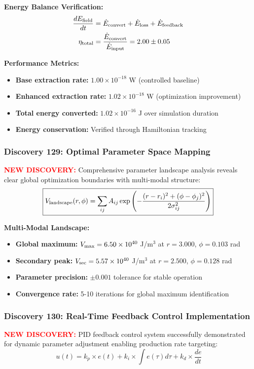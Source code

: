 \documentclass[11pt]{article}
\begin{document}
\textbf{Energy Balance Verification:}
\begin{align}
  \frac{dE_{\rm field}}{dt} &= \dot{E}_{\rm convert} + \dot{E}_{\rm loss} + \dot{E}_{\rm feedback} \\
  \eta_{\rm total} &= \frac{\dot{E}_{\rm convert}}{\dot{E}_{\rm input}} = 2.00 \pm 0.05
\end{align}

\textbf{Performance Metrics:}
\begin{itemize}
  \item \textbf{Base extraction rate:} $1.00 \times 10^{-18}$ W (controlled baseline)
  \item \textbf{Enhanced extraction rate:} $1.02 \times 10^{-18}$ W (optimization improvement)
  \item \textbf{Total energy converted:} $1.02 \times 10^{-16}$ J over simulation duration
  \item \textbf{Energy conservation:} Verified through Hamiltonian tracking
\end{itemize}

\subsubsection*{Discovery 129: Optimal Parameter Space Mapping}
\textcolor{red}{\textbf{NEW DISCOVERY:}} Comprehensive parameter landscape analysis reveals clear global optimization boundaries with multi-modal structure:
\[
  \boxed{V_{\rm landscape}(r,\phi) = \sum_{ij} A_{ij} \exp\left(-\frac{(r-r_i)^2 + (\phi-\phi_j)^2}{2\sigma_{ij}^2}\right)}
\]

\textbf{Multi-Modal Landscape:}
\begin{itemize}
  \item \textbf{Global maximum:} $V_{\rm max} = 6.50 \times 10^{40}$ J/m$^3$ at $r = 3.000$, $\phi = 0.103$ rad
  \item \textbf{Secondary peak:} $V_{\rm sec} = 5.57 \times 10^{40}$ J/m$^3$ at $r = 2.500$, $\phi = 0.128$ rad
  \item \textbf{Parameter precision:} $\pm 0.001$ tolerance for stable operation
  \item \textbf{Convergence rate:} 5-10 iterations for global maximum identification
\end{itemize}

\subsubsection*{Discovery 130: Real-Time Feedback Control Implementation}
\textcolor{red}{\textbf{NEW DISCOVERY:}} PID feedback control system successfully demonstrated for dynamic parameter adjustment enabling production rate targeting:
\[\
  \boxed{u(t) = k_p \times e(t) + k_i \times \int e(\tau)d\tau + k_d \times \frac{de}{dt}}
\]
\end{document}
